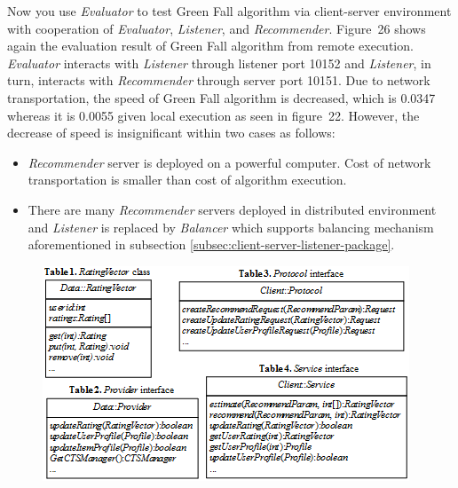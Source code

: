 \documentclass[a4paper]{llncs}
\begin{document}
Now you use \textit{Evaluator} to test Green Fall algorithm via client-server environment with cooperation of \textit{Evaluator}, \textit{Listener}, and \textit{Recommender}. Figure~26 shows again the evaluation result of Green Fall algorithm from remote execution. \textit{Evaluator} interacts with \textit{Listener} through listener port 10152 and \textit{Listener}, in turn, interacts with \textit{Recommender} through server port 10151. Due to network transportation, the speed of Green Fall algorithm is decreased, which is 0.0347 whereas it is 0.0055 given local execution as seen in figure~22. However, the decrease of speed is insignificant within two cases as follows:
\begin{itemize}
\item \textit{Recommender} server is deployed on a powerful computer. Cost of network transportation is smaller than cost of algorithm execution.
\item There are many \textit{Recommender} servers deployed in distributed environment and \textit{Listener} is replaced by \textit{Balancer} which supports balancing mechanism aforementioned in subsection \ref{subsec:client-server-listener-package}.
\end{itemize}

\begin{figure}
\centering
\includegraphics{MultiTables.png}
\end{figure}
\end{document}
